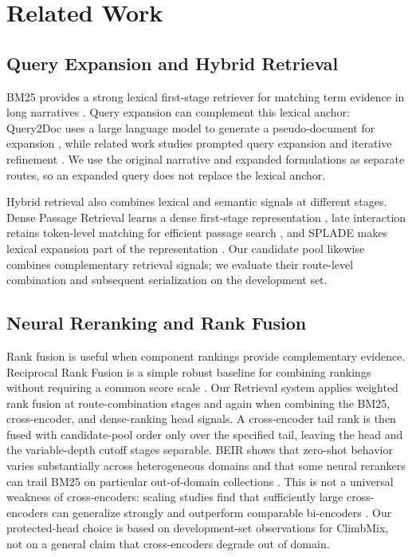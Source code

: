 \section{Related Work}

\subsection{Query Expansion and Hybrid Retrieval}

BM25 provides a strong lexical first-stage retriever for matching
term evidence in long narratives \citep{robertson2009probabilistic}.
Query expansion can complement this lexical anchor: Query2Doc uses a
large language model to generate a pseudo-document for expansion
\citep{wang2023query2doc}, while related work studies prompted query
expansion and iterative refinement \citep{jagerman2023queryexpansion,chen2024analyze}.
We use the original narrative and expanded formulations as separate
routes, so an expanded query does not replace the lexical anchor.

Hybrid retrieval also combines lexical and semantic signals at
different stages. Dense Passage Retrieval learns a dense first-stage
representation \citep{karpukhin2020dpr}, late interaction retains
token-level matching for efficient passage search
\citep{khattab2020colbert}, and SPLADE makes lexical expansion part of
the representation \citep{formal2021splade,formal2021spladev2}. Our
candidate pool likewise combines complementary retrieval signals; we
evaluate their route-level combination and subsequent serialization
on the development set.

\subsection{Neural Reranking and Rank Fusion}

Rank fusion is useful when component rankings provide complementary
evidence. Reciprocal Rank Fusion is a simple robust baseline for
combining rankings without requiring a common score scale
\citep{cormack2009rrf}. Our Retrieval system applies weighted rank
fusion at route-combination stages and again when combining the
BM25, cross-encoder, and dense-ranking head signals. A cross-encoder tail
rank is then fused with candidate-pool order only over the specified
tail, leaving the head and the variable-depth cutoff stages separable.
BEIR shows that zero-shot behavior varies substantially
across heterogeneous domains and that some neural rerankers can trail
BM25 on particular out-of-domain collections \citep{thakur2021beir}.
This is not a universal weakness of cross-encoders: scaling studies
find that sufficiently large cross-encoders can generalize strongly
and outperform comparable bi-encoders \citep{rosa2022crossencoders}.
Our protected-head choice is based on development-set observations for
ClimbMix, not on a general claim that cross-encoders degrade out of
domain.

